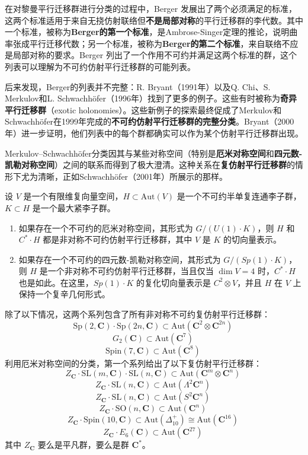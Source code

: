 在对黎曼平行迁移群进行分类的过程中，Berger 发展出了两个必须满足的标准，这两个标准适用于来自无挠仿射联络但\textbf{不是局部对称}的平行迁移群的李代数。其中一个标准，被称为\textbf{Berger的第一个标准}，是Ambrose-Singer定理的推论，说明曲率张成平行迁移代数；另一个标准，被称为\textbf{Berger的第二个标准}，来自联络不应是局部对称的要求。Berger 列出了一个作用不可约并满足这两个标准的群，这个列表可以理解为不可约仿射平行迁移群的可能列表。

后来发现，Berger的列表并不完整：R. Bryant（1991年）以及Q. Chi、S. Merkulov和L. Schwachhöfer（1996年）找到了更多的例子。这些有时被称为\textbf{奇异平行迁移群}（exotic holonomies）。这些新例子的探索最终促成了Merkulov和Schwachhöfer在1999年完成的\textbf{不可约仿射平行迁移群的完整分类}。Bryant（2000年）进一步证明，他们列表中的每个群都确实可以作为某个仿射平行迁移群出现。

Merkulov–Schwachhöfer分类因其与某些对称空间（特别是\textbf{厄米对称空间}和\textbf{四元数-凯勒对称空间}）之间的联系而得到了极大澄清。这种关系在\textbf{复仿射平行迁移群}的情形下尤为清晰，正如Schwachhöfer（2001年）所展示的那样。

设 \( V \) 是一个有限维复向量空间，\( H \subset \text{Aut}(V) \) 是一个不可约半单复连通李子群，\( K \subset H \) 是一个最大紧李子群。
\begin{enumerate}
\item 如果存在一个不可约的厄米对称空间，其形式为 \( G / (U(1) \cdot K) \)，则 \( H \) 和 \( C^* \cdot H \) 都是非对称不可约仿射平行迁移群，其中 \( V \) 是 \( K \) 的切向量表示。
\item 如果存在一个不可约的四元数-凯勒对称空间，其形式为 \( G / (Sp(1) \cdot K) \)，则 \( H \) 是一个非对称不可约仿射平行迁移群，当且仅当 \( \dim V = 4 \) 时，\( C^* \cdot H \) 也是如此。在这里，\( Sp(1) \cdot K \) 的复化切向量表示是 \( C^2 \otimes V \)，并且 \( H \) 在 \( V \) 上保持一个复辛几何形式。
\end{enumerate}
除了以下情况，这两个系列包含了所有非对称不可约复仿射平行迁移群：
\[
\mathrm{Sp}(2, \mathbf{C}) \cdot \mathrm{Sp}(2n, \mathbf{C}) \subset \mathrm{Aut}\left(\mathbf{C}^2 \otimes \mathbf{C}^{2n}\right)~
\]
\[
G_2(\mathbf{C}) \subset \mathrm{Aut}\left(\mathbf{C}^7\right)~
\]
\[
\mathrm{Spin}(7, \mathbf{C}) \subset \mathrm{Aut}\left(\mathbf{C}^8\right)~
\]
利用厄米对称空间的分类，第一个系列给出了以下复仿射平行迁移群：
\[
Z_{\mathbf{C}} \cdot \mathrm{SL}(m, \mathbf{C}) \cdot \mathrm{SL}(n, \mathbf{C}) \subset \mathrm{Aut}\left(\mathbf{C}^m \otimes \mathbf{C}^n\right)~
\]
\[
Z_{\mathbf{C}} \cdot \mathrm{SL}(n, \mathbf{C}) \subset \mathrm{Aut}\left(\Lambda^2 \mathbf{C}^n\right)~
\]
\[
Z_{\mathbf{C}} \cdot \mathrm{SL}(n, \mathbf{C}) \subset \mathrm{Aut}\left(S^2 \mathbf{C}^n\right)~
\]
\[
Z_{\mathbf{C}} \cdot \mathrm{SO}(n, \mathbf{C}) \subset \mathrm{Aut}\left(\mathbf{C}^n\right)~
\]
\[
Z_{\mathbf{C}} \cdot \mathrm{Spin}(10, \mathbf{C}) \subset \mathrm{Aut}\left(\Delta_{10}^+\right) \cong \mathrm{Aut}\left(\mathbf{C}^{16}\right)~
\]
\[
Z_{\mathbf{C}} \cdot E_6(\mathbf{C}) \subset \mathrm{Aut}\left(\mathbf{C}^{27}\right)~
\]
其中 \(Z_{\mathbf{C}}\) 要么是平凡群，要么是群 \( \mathbf{C}^* \)。

